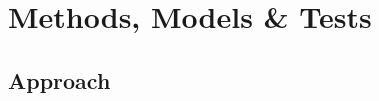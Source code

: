 \documentclass[sn-mathphys]{sn-jnl}%
\theoremstyle{thmstyleone}%
\theoremstyle{thmstyletwo}%
\theoremstyle{thmstylethree}%
\begin{document}



\section{Methods, Models \& Tests}
\subsection{Approach}
\end{document}
